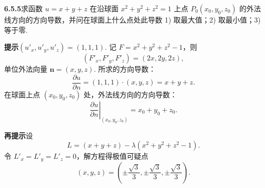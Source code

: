 \documentclass[UTF8, 12pt, fontset=fandol, oneside]{ctexart}
\begin{document}
\noindent\textbf{6.5.5}\quad 求函数 $u=x+y+z$ 在沿球面
$x^2+y^2+z^2=1$ 上点 $P_0(x_0,y_0,z_0)$ 的外法线方向的方向导数，并问在球面上什么点处此导数
1) 取最大值；2) 取最小值；3) 等于零.

\noindent\textbf{提示}\quad $(u'_x,u'_y,u'_z)=(1,1,1)$. 记
$F=x^2+y^2+z^2-1$，则
\[
  (F'_x,F'_y,F'_z)=(2x,2y,2z),
\]
单位外法向量 $\mathbf n=(x,y,z)$. 所求的方向导数：
\[
  \frac{\partial u}{\partial n}=(1,1,1)\cdot(x,y,z)=x+y+z.
\]
在球面上点 $(x_0,y_0,z_0)$ 处，外法线方向的方向导数：
\[
  \left.\frac{\partial u}{\partial n}\right|_{(x_0,y_0,z_0)}
  =
  x_0+y_0+z_0.
\]

\noindent\textbf{再提示}\quad 设
\[
  L=(x+y+z)-\lambda(x^2+y^2+z^2-1).
\]
令 $L'_x=L'_y=L'_z=0$，解方程得极值可疑点
\[
  (x,y,z)=\left(\pm\frac{\sqrt3}{3},\pm\frac{\sqrt3}{3},\pm\frac{\sqrt3}{3}\right).
\]
\end{document}
